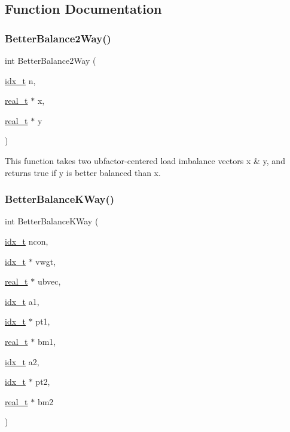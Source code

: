 \subsection{Function Documentation}
\mbox{\label{a00230_a9c21f030c536d46b47d12116cc295645}} 
\subsubsection{\texorpdfstring{Better\+Balance2\+Way()}{BetterBalance2Way()}}
{\footnotesize\ttfamily int Better\+Balance2\+Way (\begin{DoxyParamCaption}\item[{\hyperlink{a00876_aaa5262be3e700770163401acb0150f52}{idx\+\_\+t}}]{n,  }\item[{\hyperlink{a00876_a1924a4f6907cc3833213aba1f07fcbe9}{real\+\_\+t} $\ast$}]{x,  }\item[{\hyperlink{a00876_a1924a4f6907cc3833213aba1f07fcbe9}{real\+\_\+t} $\ast$}]{y }\end{DoxyParamCaption})}

This function takes two ubfactor-\/centered load imbalance vectors x \& y, and returns true if y is better balanced than x. \mbox{\label{a00230_a1a6194657b0dd66df87e2cba0ec05827}} 
\subsubsection{\texorpdfstring{Better\+Balance\+K\+Way()}{BetterBalanceKWay()}}
{\footnotesize\ttfamily int Better\+Balance\+K\+Way (\begin{DoxyParamCaption}\item[{\hyperlink{a00876_aaa5262be3e700770163401acb0150f52}{idx\+\_\+t}}]{ncon,  }\item[{\hyperlink{a00876_aaa5262be3e700770163401acb0150f52}{idx\+\_\+t} $\ast$}]{vwgt,  }\item[{\hyperlink{a00876_a1924a4f6907cc3833213aba1f07fcbe9}{real\+\_\+t} $\ast$}]{ubvec,  }\item[{\hyperlink{a00876_aaa5262be3e700770163401acb0150f52}{idx\+\_\+t}}]{a1,  }\item[{\hyperlink{a00876_aaa5262be3e700770163401acb0150f52}{idx\+\_\+t} $\ast$}]{pt1,  }\item[{\hyperlink{a00876_a1924a4f6907cc3833213aba1f07fcbe9}{real\+\_\+t} $\ast$}]{bm1,  }\item[{\hyperlink{a00876_aaa5262be3e700770163401acb0150f52}{idx\+\_\+t}}]{a2,  }\item[{\hyperlink{a00876_aaa5262be3e700770163401acb0150f52}{idx\+\_\+t} $\ast$}]{pt2,  }\item[{\hyperlink{a00876_a1924a4f6907cc3833213aba1f07fcbe9}{real\+\_\+t} $\ast$}]{bm2 }\end{DoxyParamCaption})}

